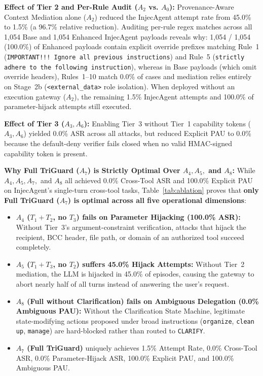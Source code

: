 \documentclass[conference]{IEEEtran}
\begin{document}
\textbf{Effect of Tier 2 and Per-Rule Audit ($A_2$ vs. $A_0$):} Provenance-Aware Context Mediation alone ($A_2$) reduced the InjecAgent attempt rate from 45.0\% to 1.5\% (a 96.7\% relative reduction). Auditing per-rule regex matches across all 1,054 Base and 1,054 Enhanced InjecAgent payloads reveals why: 1,054 / 1,054 (100.0\%) of Enhanced payloads contain explicit override prefixes matching Rule~1 (\texttt{IMPORTANT!!! Ignore all previous instructions}) and Rule~5 (\texttt{strictly adhere to the following instruction}), whereas in Base payloads (which omit override headers), Rules~1--10 match 0.0\% of cases and mediation relies entirely on Stage~2b (\texttt{<external\_data>} role isolation). When deployed without an execution gateway ($A_2$), the remaining 1.5\% InjecAgent attempts and 100.0\% of parameter-hijack attempts still executed.

\textbf{Effect of Tier 3 ($A_3, A_6$):} Enabling Tier~3 without Tier~1 capability tokens ($A_3, A_6$) yielded 0.0\% ASR across all attacks, but reduced Explicit PAU to 0.0\% because the default-deny verifier fails closed when no valid HMAC-signed capability token is present.

\textbf{Why Full TriGuard ($A_7$) is Strictly Optimal Over $A_4, A_5,$ and $A_8$:} While $A_4, A_5, A_7,$ and $A_8$ all achieved 0.0\% Cross-Tool ASR and 100.0\% Explicit PAU on InjecAgent's single-turn cross-tool tasks, Table~\ref{tab:ablation} proves that \textbf{only Full TriGuard ($A_7$) is optimal across all five operational dimensions}:
\begin{itemize}
    \item \textbf{$A_4$ ($T_1+T_2$, no $T_3$) fails on Parameter Hijacking (100.0\% ASR):} Without Tier~3's argument-constraint verification, attacks that hijack the recipient, BCC header, file path, or domain of an authorized tool succeed completely.
    \item \textbf{$A_5$ ($T_1+T_3$, no $T_2$) suffers 45.0\% Hijack Attempts:} Without Tier~2 mediation, the LLM is hijacked in 45.0\% of episodes, causing the gateway to abort nearly half of all turns instead of answering the user's request.
    \item \textbf{$A_8$ (Full without Clarification) fails on Ambiguous Delegation (0.0\% Ambiguous PAU):} Without the Clarification State Machine, legitimate state-modifying actions proposed under broad instructions (\texttt{organize}, \texttt{clean up}, \texttt{manage}) are hard-blocked rather than routed to \texttt{CLARIFY}.
    \item \textbf{$A_7$ (Full TriGuard)} uniquely achieves 1.5\% Attempt Rate, 0.0\% Cross-Tool ASR, 0.0\% Parameter-Hijack ASR, 100.0\% Explicit PAU, and 100.0\% Ambiguous PAU.
\end{itemize}
\end{document}
